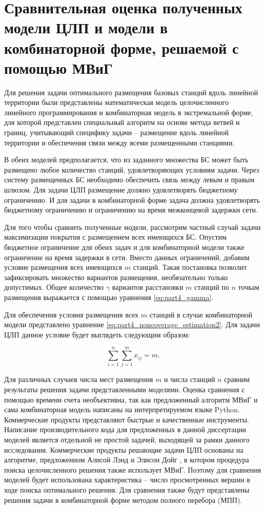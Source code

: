 \section{Сравнительная оценка полученных модели ЦЛП и модели в комбинаторной форме, решаемой с помощью МВиГ}
Для решения задачи оптимального размещения базовых станций вдоль линейной территории были представлены математическая модель целочисленного линейного программирования и комбинаторная модель в экстремальной форме, для которой представлен специальный алгоритм на основе метода ветвей и границ, учитывающий специфику задачи -- размещение вдоль линейной территории и обеспечения связи между всеми размещенными станциями.

В обеих моделей предполагается, что из заданного множества БС может быть размещено любое количество станций, удовлетворяющих условиям задачи. Через систему размещенных БС необходимо обеспечить связь между левым и правым шлюзом. Для задачи ЦЛП размещение должно удовлетворять бюджетному ограничению. И для задачи в комбинаторной форме задача должна удовлетворять бюджетному ограничению и ограничению на время межконцевой задержки сети.

Для того чтобы сравнить полученные модели, рассмотрим частный случай задачи максимизации покрытия с размещением всех имеющихся БС. Опустим бюджетное ограничение для обеих задач и для комбинаторной модели также ограничение на время задержки в сети. Вместо данных ограничений, добавим условие размещения всех имеющихся $m$ станций. Такая постановка позволит зафиксировать множество вариантов размещения, необязательно только допустимых. Общее количество $\gamma$ вариантов расстановки $m$ станций по $n$ точкам размещения выражается с помощью уравнения \cref{eq:part4_gamma}.


Для обеспечения условия размещения всех $m$ станций в случае комбинаторной модели представлено уравнение \cref{eq:part4_noncoverage_estimation2}. Для задачи ЦЛП данное условие будет выглядеть следующим образом:


\begin{equation}
  \label{eq:part3_placed_all_station}
  \sum\limits_{i=1}^n \sum\limits_{j=1}^m x_{ij} = m.
\end{equation}

Для различных случаев числа мест размещения $m$ и числа станций $n$ сравним результаты решения задачи представленными моделями. Оценка сравнения с помощью времени счета необъективна, так как предложенный алгоритм МВиГ и сама комбинаторная модель написаны на интерпретируемом языке Python. Коммерческие продукты представляют быстрые и качественные инструменты. Написание производительного кода для предложенных в данной диссертации моделей является отдельной не простой задачей, выходящей за рамки данного исследования. Коммерческие продукты решающие задачи ЦЛП основаны на алгоритме, предложенном Алисой Лэнд и Элисон Дойг \cite{Land1960}, в котором процедура поиска целочисленного решения также использует МВиГ.  Поэтому для сравнения моделей будет использована характеристика -- число просмотренных вершин в ходе поиска оптимального решения. Для сравнения также будут представлены решения задачи в комбинаторной форме методом полного перебора (МПП).

